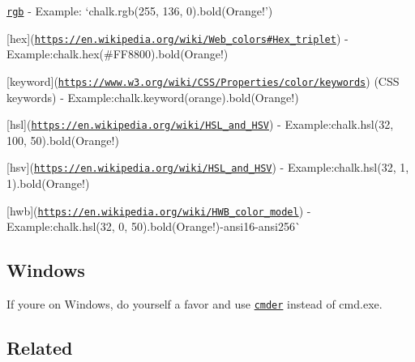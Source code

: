 \begin{DoxyItemize}
\item \href{https://en.wikipedia.org/wiki/RGB_color_model}{\tt {\ttfamily rgb}} -\/ Example\+: `chalk.\+rgb(255, 136, 0).bold(\textquotesingle{}Orange!'){\ttfamily }
\item {\ttfamily \mbox{[}}hex{\ttfamily \mbox{]}(\href{https://en.wikipedia.org/wiki/Web_colors#Hex_triplet}{\tt https\+://en.\+wikipedia.\+org/wiki/\+Web\+\_\+colors\#\+Hex\+\_\+triplet}) -\/ Example\+:}chalk.\+hex(\textquotesingle{}\#\+F\+F8800\textquotesingle{}).bold(\textquotesingle{}Orange!\textquotesingle{}){\ttfamily }
\item {\ttfamily \mbox{[}}keyword{\ttfamily \mbox{]}(\href{https://www.w3.org/wiki/CSS/Properties/color/keywords}{\tt https\+://www.\+w3.\+org/wiki/\+C\+S\+S/\+Properties/color/keywords}) (C\+SS keywords) -\/ Example\+:}chalk.\+keyword(\textquotesingle{}orange\textquotesingle{}).bold(\textquotesingle{}Orange!\textquotesingle{}){\ttfamily }
\item {\ttfamily \mbox{[}}hsl{\ttfamily \mbox{]}(\href{https://en.wikipedia.org/wiki/HSL_and_HSV}{\tt https\+://en.\+wikipedia.\+org/wiki/\+H\+S\+L\+\_\+and\+\_\+\+H\+SV}) -\/ Example\+:}chalk.\+hsl(32, 100, 50).bold(\textquotesingle{}Orange!\textquotesingle{}){\ttfamily }
\item {\ttfamily \mbox{[}}hsv{\ttfamily \mbox{]}(\href{https://en.wikipedia.org/wiki/HSL_and_HSV}{\tt https\+://en.\+wikipedia.\+org/wiki/\+H\+S\+L\+\_\+and\+\_\+\+H\+SV}) -\/ Example\+:}chalk.\+hsl(32, 1, 1).bold(\textquotesingle{}Orange!\textquotesingle{}){\ttfamily }
\item {\ttfamily \mbox{[}}hwb{\ttfamily \mbox{]}(\href{https://en.wikipedia.org/wiki/HWB_color_model}{\tt https\+://en.\+wikipedia.\+org/wiki/\+H\+W\+B\+\_\+color\+\_\+model}) -\/ Example\+:}chalk.\+hsl(32, 0, 50).bold(\textquotesingle{}Orange!\textquotesingle{}){\ttfamily  -\/}ansi16{\ttfamily  -\/}ansi256\`{}
\end{DoxyItemize}

\subsection*{Windows}

If you\textquotesingle{}re on Windows, do yourself a favor and use \href{http://cmder.net/}{\tt {\ttfamily cmder}} instead of {\ttfamily cmd.\+exe}.

\subsection*{Related}


